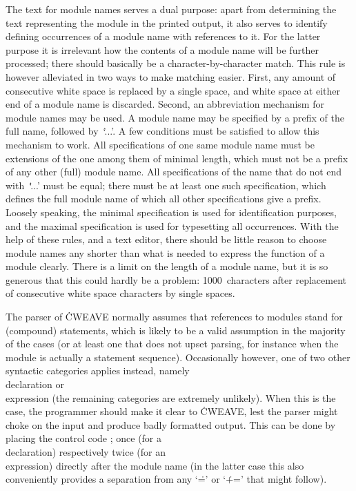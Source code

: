 The text for module names serves a dual purpose: apart from determining the
text representing the module in the printed output, it also serves to
identify defining occurrences of a module name with references to it. For
the latter purpose it is irrelevant how the contents of a module name will
be further processed; there should basically be a character-by-character
match. This rule is however alleviated in two ways to make matching easier.
First, any amount of consecutive white space is replaced by a single space,
and white space at either end of a module name is discarded. Second, an
abbreviation mechanism for module names may be used. A module name may be
specified by a prefix of the full name, followed by~`\.{...}'. A few
conditions must be satisfied to allow this mechanism to work. All
specifications of one same module name must be extensions of the one among
them of minimal length, which must not be a prefix of any other (full)
module name. All specifications of the name that do not end with~`\.{...}'
must be equal; there must be at least one such specification, which defines
the full module name of which all other specifications give a prefix.
Loosely speaking, the minimal specification is used for identification
purposes, and the maximal specification is used for typesetting all
occurrences. With the help of these rules, and a text editor, there should
be little reason to choose module names any shorter than what is needed to
express the function of a module clearly. There is a limit on the length of
a module name, but it is so generous that this could hardly be a problem:
1000~characters after replacement of consecutive white space characters by
single spaces.

The parser of \.{CWEAVE} normally assumes that references to modules stand
for (compound) statements, which is likely to be a valid assumption in the
majority of the cases (or at least one that does not upset parsing, for
instance when the module is actually a statement sequence).  Occasionally
however, one of two other syntactic categories applies instead, namely
\\{declaration} or \\{expression} (the remaining categories are extremely
unlikely). When this is the case, the programmer should make it clear to
\.{CWEAVE}, lest the parser might choke on the input and produce badly
formatted output. This can be done by placing the control code \:; once (for
a \\{declaration}) respectively twice (for an \\{expression}) directly after
the module name (in the latter case this also conveniently provides a
separation from any `\.=' or `\.{+=}' that might follow).

